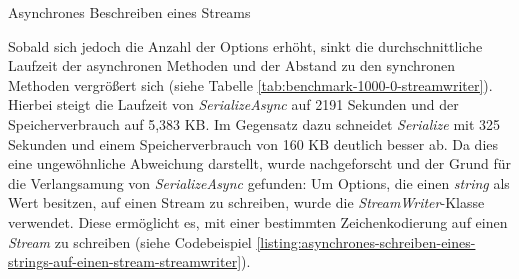 \begin{listing}[h]
    \inputminted[framesep=2mm, baselinestretch=1.2, fontsize=\normalsize, linenos]{csharp}{codes/example_write_async_stream.cs}
    \caption{Asynchrones Beschreiben eines Streams}
    \label{listing:asynchrones-beschreiben-eines-streams}
\end{listing}

\begin{table}[h]
    \caption{Benchmark mit 1000 Options und mit einer Payload von 0 Bytes, jedoch mit StreamWriter}
    \label{tab:benchmark-1000-0-streamwriter}
\end{table}

Sobald sich jedoch die Anzahl der Options erhöht, sinkt die durchschnittliche Laufzeit der asynchronen Methoden und der Abstand zu den synchronen Methoden vergrößert sich (siehe Tabelle \ref{tab:benchmark-1000-0-streamwriter}). Hierbei steigt die Laufzeit von \textit{SerializeAsync} auf 2191 Sekunden und der Speicherverbrauch auf 5,383 KB. Im Gegensatz dazu schneidet \textit{Serialize} mit 325 Sekunden und einem Speicherverbrauch von 160 KB deutlich besser ab. Da dies eine ungewöhnliche Abweichung darstellt, wurde nachgeforscht und der Grund für die Verlangsamung von \textit{SerializeAsync} gefunden: Um Options, die einen \textit{string} als Wert besitzen, auf einen Stream zu schreiben, wurde die \textit{StreamWriter}-Klasse verwendet. Diese ermöglicht es, mit einer bestimmten Zeichenkodierung auf einen \textit{Stream} zu schreiben (siehe Codebeispiel \ref{listing:asynchrones-schreiben-eines-strings-auf-einen-stream-streamwriter}).

